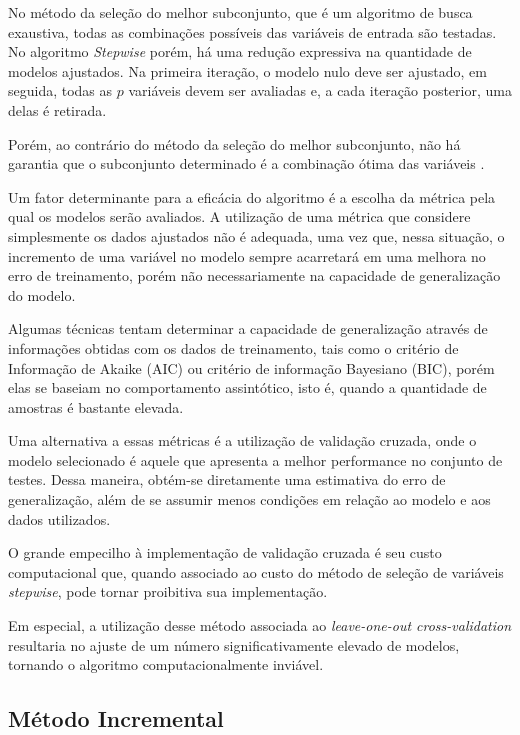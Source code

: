 \qquad

No método da seleção do melhor subconjunto, que é um algoritmo de busca exaustiva, todas as combinações possíveis das variáveis de entrada são testadas. No algoritmo \textit{Stepwise} porém, há uma redução expressiva na quantidade de modelos ajustados. Na primeira iteração, o modelo nulo deve ser ajustado, em seguida, todas as $p$ variáveis devem ser avaliadas e, a cada iteração posterior, uma delas é retirada.

Porém, ao contrário do método da seleção do melhor subconjunto, não há garantia que o subconjunto determinado é a combinação ótima das variáveis \cite[p. 208]{intro_stat_learn}.

Um fator determinante para a eficácia do algoritmo é a escolha da métrica pela qual os modelos serão avaliados. A utilização de uma métrica que considere simplesmente os dados ajustados não é adequada, 
uma vez que, nessa situação, o incremento de uma variável no modelo sempre acarretará em uma melhora no erro de treinamento, porém não necessariamente na capacidade de generalização do modelo.

Algumas técnicas tentam determinar a capacidade de generalização através de informações obtidas com os dados de treinamento, tais como o critério de Informação de Akaike (AIC) ou critério de informação Bayesiano (BIC), porém elas se baseiam no comportamento assintótico, isto é, quando a quantidade de amostras é bastante elevada.

Uma alternativa a essas métricas é a utilização de validação cruzada, onde o modelo selecionado é aquele que apresenta a melhor performance no conjunto de testes. Dessa maneira, obtém-se diretamente uma estimativa do erro de generalização, além de se assumir menos condições em relação ao modelo e aos dados utilizados. 

O grande empecilho à implementação de validação cruzada é seu custo computacional que, quando associado ao custo do método de seleção de variáveis \textit{stepwise}, pode tornar proibitiva sua implementação.

Em especial, a utilização desse método associada ao \textit{leave-one-out cross-validation} resultaria no ajuste de um número significativamente elevado de modelos, tornando o algoritmo computacionalmente inviável.
\FloatBarrier

\subsection{Método Incremental}

